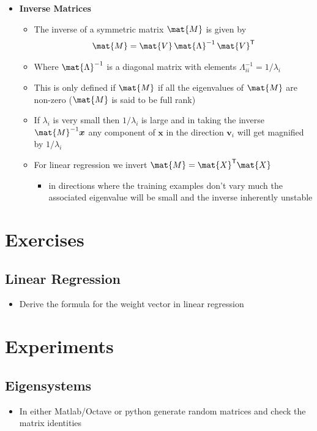 \documentclass[11pt]{article}
\newcommand{\tr}{\textsf{T}}
\begin{document}
\begin{itemize}
\item \textbf{Inverse Matrices}
\begin{itemize}
\item The inverse of a symmetric matrix \(\mat{M}\) is given by
\begin{align*}
  \mat{M} = \mat{V}\,\mat{\Lambda}^{-1}\,\mat{V}^\tr
\end{align*}
\item Where \(\mat{\Lambda}^{-1}\) is a diagonal matrix with elements \(\Lambda_{ii}^{-1}=1/\lambda_i\)
\item This is only defined if \(\mat{M}\) if all the eigenvalues of
\(\mat{M}\) are non-zero  (\(\mat{M}\) is said to be full rank)
\item If \(\lambda_i\) is very small then \(1/\lambda_i\) is large and in
taking the inverse \(\mat{M}^{-1}\bm{x}\) any component of \(\bm{x}\)
in the direction \(\bm{v}_i\) will get magnified by \(1/\lambda_i\)
\item For linear regression we invert \(\mat{M} = \mat{X}^\tr\mat{X}\)
\begin{itemize}
\item in directions where the training examples don't vary much the
associated eigenvalue will be small and the inverse inherently
unstable
\end{itemize}
\end{itemize}
\end{itemize}


\section{Exercises}
\label{sec:org8984fac}

\subsection{Linear Regression}
\label{sec:orgbb9e1b2}
\begin{itemize}
\item Derive the formula for the weight vector in linear regression
\end{itemize}

\section{Experiments}
\label{sec:org9095c48}

\subsection{Eigensystems}
\label{sec:orge716d87}
\begin{itemize}
\item In either Matlab/Octave or python generate random matrices and check
the matrix identities
\end{itemize}
\end{document}
